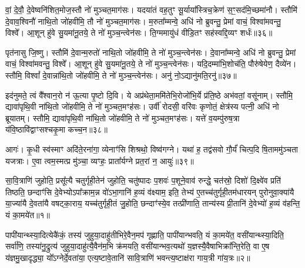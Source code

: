 वां॒ दे॒वौ॒ दे॒वेष्वनि॑शित॒मोज॒स्तौ नो॑ मुञ्चत॒माग॑सः। यदया॑तं वह॒तुꣳ सू॒र्याया᳚स्त्रिच॒क्रेण॑ स॒ꣳ॒सद॑मि॒च्छमा॑नौ। स्तौमि॑ दे॒वाव॒श्विनौ॑ नाथि॒तो जो॑हवीमि॒ तौ नो॑ मुञ्चत॒माग॑सः। म॒रुता᳚म्मन्वे॒ अधि॑ नो ब्रुवन्तु॒ प्रेमां वाचं॒ विश्वा॑मवन्तु॒ विश्वे᳚। आ॒शून् हु॑वे सु॒यमा॑नू॒तये॒ ते नो॑ मुञ्च॒न्त्वेन॑सः। ति॒ग्ममायु॑धं वीडि॒तꣳ सह॑स्वद्दि॒व्यꣳ शर्धः॑॥३६॥

पृत॑नासु जि॒ष्णु। स्तौमि॑ दे॒वान्म॒रुतो॑ नाथि॒तो जो॑हवीमि॒ ते नो॑ मुञ्च॒न्त्वेन॑सः। दे॒वाना᳚म्मन्वे॒ अधि॑ नो ब्रुवन्तु॒ प्रेमां वाचं॒ विश्वा॑मवन्तु॒ विश्वे᳚। आ॒शून् हु॑वे सु॒यमा॑नू॒तये॒ ते नो॑ मुञ्च॒न्त्वेन॑सः। यदि॒दम्मा॑भि॒शोच॑ति॒ पौरु॑षेयेण॒ दैव्ये॑न। स्तौमि॒ विश्वां᳚ दे॒वान्ना॑थि॒तो जो॑हवीमि॒ ते नो॑ मुञ्च॒न्त्वेन॑सः। अनु॑ नो॒\-ऽद्यानु॑मति॒रनु॑॥३७॥

इद॑नुमते॒ त्वं वै᳚श्वान॒रो न॑ ऊ॒त्या पृ॒ष्टो दि॒वि। ये अप्र॑थेता॒ममि॑तेभि॒रोजो॑भि॒र्ये प्र॑ति॒ष्ठे अभ॑वतां॒ वसू॑नाम्। स्तौमि॒ द्यावा॑पृथि॒वी ना॑थि॒तो जो॑हवीमि॒ ते नो॑ मुञ्चत॒मꣳह॑सः। उर्वी॑ रोदसी॒ वरि॑वः कृणोतं॒ क्षेत्र॑स्य पत्नी॒ अधि॑ नो ब्रूयातम्। स्तौमि॒ द्यावा॑पृथि॒वी ना॑थि॒तो जो॑हवीमि॒ ते नो॑ मुञ्चत॒मꣳह॑सः। यत्ते॑ व॒यम्पु॑रुष॒त्रा य॑वि॒ष्ठावि॑द्वाꣳसश्चकृ॒मा कच्च॒न॥३८॥

आगः॑। कृ॒धी स्व॑स्माꣳ अदि॑ते॒रना॑गा॒ व्येनाꣳ॑सि शिश्रथो॒ विष्व॑गग्ने। यथा॑ ह॒ तद्व॑सवो गौ॒र्यं॑ चित्प॒दि षि॒ताममु॑ञ्चता यजत्राः। ए॒वा त्वम॒स्मत्प्र मु॑ञ्चा॒ व्यꣳहः॒ प्राता᳚र्यग्ने प्रत॒रां न॒ आयुः॑॥३९॥


{\anuvakamend[{गन्ता॑ दू॒षय॒न्थ्स्तौमि॒ ययोः॒ शर्धो\-ऽनु॑मति॒रनु॑ च॒न चतु॑स्त्रिꣳशच्च॥15॥}]}

{\anuvakamend[{अ॒ग्निष्ट्वा॑ वा॒मश्वो॒ द्विच॑त्वारिꣳशच्च॥11॥}]}

\setcounter{anuvakam}{0}
सा॒वि॒त्राणि॑ जुहोति॒ प्रसू᳚त्यै चतुर्गृही॒तेन॑ जुहोति॒ चतु॑ष्पादः प॒शवः॑ प॒शूने॒वाव॑ रुन्द्धे॒ चत॑स्रो॒ दिशो॑ दि॒क्ष्वे॑व प्रति॑ तिष्ठति॒ छन्दाꣳ॑सि दे॒वेभ्यो\-ऽपा᳚क्राम॒न्न वो॑\-ऽभा॒गानि॑ ह॒व्यं व॑क्ष्याम॒ इति॒ तेभ्य॑ ए॒तच्च॑तुर्गृही॒तम॑धारयन् पुरोनुवा॒क्या॑यै या॒ज्या॑यै दे॒वता॑यै वषट्का॒राय॒ यच्च॑तुर्गृही॒तं जु॒होति॒ छन्दाꣳ॑स्ये॒व तत्प्री॑णाति॒ तान्य॑स्य प्री॒तानि॑ दे॒वेभ्यो॑ ह॒व्यं व॑हन्ति॒ यं का॒मये॑त॥१॥

पापी॑यान्थ्स्या॒दित्येकै॑कं॒ तस्य॑ जुहुया॒दाहु॑तीभिरे॒वैन॒मप॑ गृह्णाति॒ पापी॑यान्भवति॒ यं का॒मये॑त॒ वसी॑यान्थ्स्या॒दिति॒ सर्वा॑णि॒ तस्या॑नु॒द्रुत्य॑ जुहुया॒दाहु॑त्यै॒वैन॑म॒भि क्र॑मयति॒ वसी॑यान्भव॒त्यथो॑ य॒ज्ञस्यै॒वैषाभिक्रा᳚न्ति॒रेति॒ वा ए॒ष य॑ज्ञमु॒खादृद्ध्या॒ यो᳚\-ऽग्नेर्दे॒वता॑या॒ एत्य॒ष्टावे॒तानि॑ सावि॒त्राणि॑ भवन्त्य॒ष्टाक्ष॑रा गाय॒त्री गा॑य॒त्रः॥२॥

